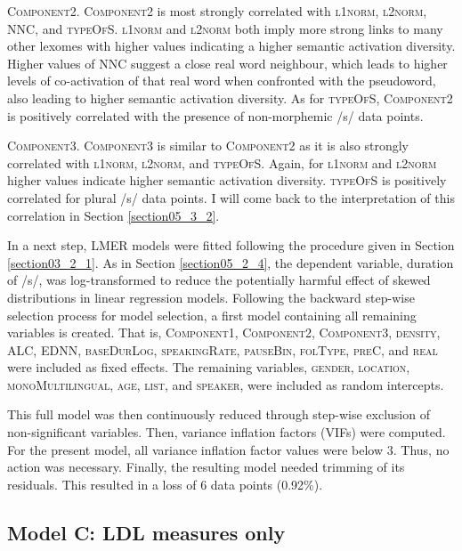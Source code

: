 \textsc{Component2}. \textsc{Component2} is most strongly correlated with \textsc{l1norm}, \textsc{l2norm}, \textsc{NNC}, and \textsc{typeOfS}. \textsc{l1norm} and \textsc{l2norm} both imply more strong links to many other lexomes with higher values indicating a higher semantic activation diversity. Higher values of \textsc{NNC} suggest a close real word neighbour, which leads to higher levels of co-activation of that real word when confronted with the pseudoword, also leading to higher semantic activation diversity. As for \textsc{typeOfS}, \textsc{Component2} is positively correlated with the presence of non-morphemic /s/ data points. 

\textsc{Component3}. \textsc{Component3} is similar to \textsc{Component2} as it is also strongly correlated with \textsc{l1norm}, \textsc{l2norm}, and \textsc{typeOfS}. Again, for \textsc{l1norm} and \textsc{l2norm} higher values indicate higher semantic activation diversity. \textsc{typeOfS} is positively correlated for plural /s/ data points. I will come back to the interpretation of this correlation in Section \ref{section05_3_2}. 

In a next step, LMER models were fitted following the procedure given in Section \ref{section03_2_1}. As in Section \ref{section05_2_4}, the dependent variable, duration of /s/, was log-transformed to reduce the potentially harmful effect of skewed distributions in linear regression models. Following the backward step-wise selection process for model selection, a first model containing all remaining variables is created. That is, \textsc{Component1}, \textsc{Component2}, \textsc{Component3}, \textsc{density}, \textsc{ALC}, \textsc{EDNN}, \textsc{baseDurLog}, \textsc{speakingRate}, \textsc{pauseBin}, \textsc{folType}, \textsc{preC}, and \textsc{real} were included as fixed effects. The remaining variables, \textsc{gender}, \textsc{location}, \textsc{monoMultilingual}, \textsc{age}, \textsc{list}, and \textsc{speaker}, were included as random intercepts. 

This full model was then continuously reduced through step-wise exclusion of non-significant variables. Then, variance inflation factors (VIFs) were computed. For the present model, all variance inflation factor values were below $3$. Thus, no action was necessary. Finally, the resulting model needed trimming of its residuals. This resulted in a loss of 6 data points (0.92\%). 

\subsection{Model C: LDL measures only}\label{section05_2_6}

